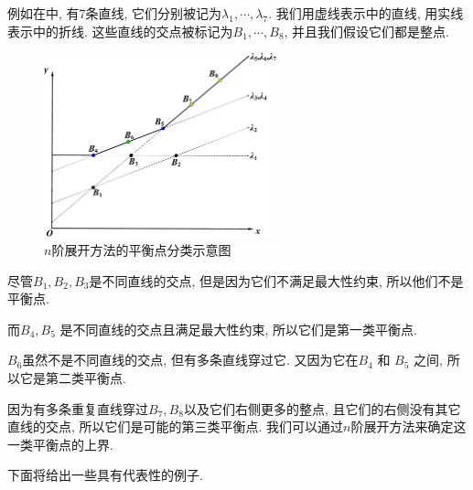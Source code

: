 例如在中, 有7条直线, 它们分别被记为$\lambda_1,\cdots,\lambda_7$. 我们用虚线表示中的直线, 用实线表示中的折线. 这些直线的交点被标记为$B_1,\cdots,B_8$, 并且我们假设它们都是整点. 
\begin{figure}[htbp]
\centering
\includegraphics[width=0.6\textwidth]{fig/ps.pdf}
\caption{$n$阶展开方法的平衡点分类示意图}
\label{point}
\end{figure}
\begin{compactitem}[\textbullet]
\item 尽管$B_1,B_2,B_3$是不同直线的交点, 但是因为它们不满足最大性约束, 所以他们不是平衡点. 
\item 而$B_4,B_5$ 是不同直线的交点且满足最大性约束, 所以它们是第一类平衡点.
\item $B_6$虽然不是不同直线的交点, 但有多条直线穿过它. 又因为它在$B_4$ 和 $B_5$ 之间, 所以它是第二类平衡点.
\item 因为有多条重复直线穿过$B_7,B_8$以及它们右侧更多的整点, 且它们的右侧没有其它直线的交点, 所以它们是可能的第三类平衡点. 我们可以通过$n$阶展开方法来确定这一类平衡点的上界.
\end{compactitem}

下面将给出一些具有代表性的例子. 

